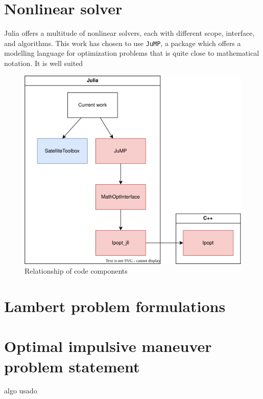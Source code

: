 \section{Nonlinear solver}

Julia offers a multitude of nonlinear solvers, each with different scope, interface, and algorithms. This work has chosen to use \texttt{JuMP}, a package which offers a modelling language for optimization problems that is quite close to mathematical notation. It is well suited 

\begin{figure}[htbp]
    \centering
        \includegraphics[width=\textwidth]{img/techstack.png}
    \caption{Relationship of code components}
    \label{fig:tech_stack}
\end{figure}

\section{Lambert problem formulations}

\section{Optimal impulsive maneuver problem statement} \label{sec:impulsive_statement}

algo usado